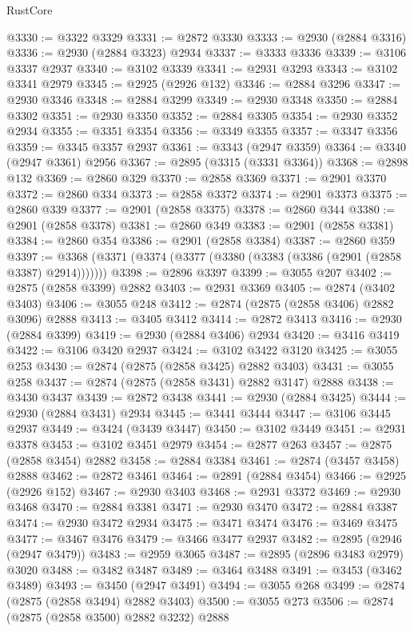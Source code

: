 \begin{lexlean}{RustCore}
\begin{coremodule}
@3330 := @3322 @3329
@3331 := @2872 @3330
@3333 := @2930 (@2884 @3316)
@3336 := @2930 (@2884 @3323) @2934
@3337 := @3333 @3336
@3339 := @3106 @3337 @2937
@3340 := @3102 @3339
@3341 := @2931 @3293
@3343 := @3102 @3341 @2979
@3345 := @2925 (@2926 @132)
@3346 := @2884 @3296
@3347 := @2930 @3346
@3348 := @2884 @3299
@3349 := @2930 @3348
@3350 := @2884 @3302
@3351 := @2930 @3350
@3352 := @2884 @3305
@3354 := @2930 @3352 @2934
@3355 := @3351 @3354
@3356 := @3349 @3355
@3357 := @3347 @3356
@3359 := @3345 @3357 @2937
@3361 := @3343 (@2947 @3359)
@3364 := @3340 (@2947 @3361) @2956
@3367 := @2895 (@3315 (@3331 @3364))
@3368 := @2898 @132
@3369 := @2860 @329
@3370 := @2858 @3369
@3371 := @2901 @3370
@3372 := @2860 @334
@3373 := @2858 @3372
@3374 := @2901 @3373
@3375 := @2860 @339
@3377 := @2901 (@2858 @3375)
@3378 := @2860 @344
@3380 := @2901 (@2858 @3378)
@3381 := @2860 @349
@3383 := @2901 (@2858 @3381)
@3384 := @2860 @354
@3386 := @2901 (@2858 @3384)
@3387 := @2860 @359
@3397 := @3368 (@3371 (@3374 (@3377 (@3380 (@3383 (@3386 (@2901 (@2858 @3387) @2914)))))))
@3398 := @2896 @3397
@3399 := @3055 @207
@3402 := @2875 (@2858 @3399) @2882
@3403 := @2931 @3369
@3405 := @2874 (@3402 @3403)
@3406 := @3055 @248
@3412 := @2874 (@2875 (@2858 @3406) @2882 @3096) @2888
@3413 := @3405 @3412
@3414 := @2872 @3413
@3416 := @2930 (@2884 @3399)
@3419 := @2930 (@2884 @3406) @2934
@3420 := @3416 @3419
@3422 := @3106 @3420 @2937
@3424 := @3102 @3422 @3120
@3425 := @3055 @253
@3430 := @2874 (@2875 (@2858 @3425) @2882 @3403)
@3431 := @3055 @258
@3437 := @2874 (@2875 (@2858 @3431) @2882 @3147) @2888
@3438 := @3430 @3437
@3439 := @2872 @3438
@3441 := @2930 (@2884 @3425)
@3444 := @2930 (@2884 @3431) @2934
@3445 := @3441 @3444
@3447 := @3106 @3445 @2937
@3449 := @3424 (@3439 @3447)
@3450 := @3102 @3449
@3451 := @2931 @3378
@3453 := @3102 @3451 @2979
@3454 := @2877 @263
@3457 := @2875 (@2858 @3454) @2882
@3458 := @2884 @3384
@3461 := @2874 (@3457 @3458) @2888
@3462 := @2872 @3461
@3464 := @2891 (@2884 @3454)
@3466 := @2925 (@2926 @152)
@3467 := @2930 @3403
@3468 := @2931 @3372
@3469 := @2930 @3468
@3470 := @2884 @3381
@3471 := @2930 @3470
@3472 := @2884 @3387
@3474 := @2930 @3472 @2934
@3475 := @3471 @3474
@3476 := @3469 @3475
@3477 := @3467 @3476
@3479 := @3466 @3477 @2937
@3482 := @2895 (@2946 (@2947 @3479))
@3483 := @2959 @3065
@3487 := @2895 (@2896 @3483 @2979) @3020
@3488 := @3482 @3487
@3489 := @3464 @3488
@3491 := @3453 (@3462 @3489)
@3493 := @3450 (@2947 @3491)
@3494 := @3055 @268
@3499 := @2874 (@2875 (@2858 @3494) @2882 @3403)
@3500 := @3055 @273
@3506 := @2874 (@2875 (@2858 @3500) @2882 @3232) @2888

\end{coremodule}
\end{lexlean}
